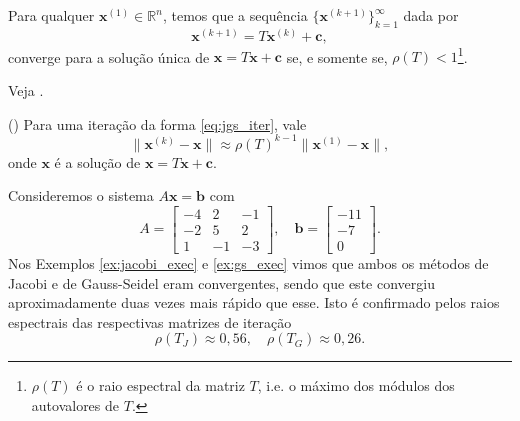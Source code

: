 \begin{teo}
  Para qualquer $\pmb{x}^{(1)}\in\mathbb{R}^n$, temos que a sequência $\{\pmb{x}^{(k+1)}\}_{k=1}^{\infty}$ dada por
  \begin{equation}
    \pmb{x}^{(k+1)} = T\pmb{x}^{(k)} + \pmb{c},
  \end{equation}
  converge para a solução única de $\pmb{x} = T\pmb{x} + \pmb{c}$ se, e somente se, $\rho(T) < 1$\footnote{$\rho(T)$ é o raio espectral da matriz $T$, i.e. o máximo dos módulos dos autovalores de $T$.}.
\end{teo}
\begin{dem}
  Veja \cite[Cap. 7, Sec. 7.3]{Burden2015a}.
\end{dem}

\begin{obs}()
  Para uma iteração da forma \eqref{eq:jgs_iter}, vale
  \begin{equation}
    \|\pmb{x}^{(k)}-\pmb{x}\| \approx \rho(T)^{k-1}\|\pmb{x}^{(1)}-\pmb{x}\|,
  \end{equation}
onde $\pmb{x}$ é a solução de $\pmb{x} = T\pmb{x} + \pmb{c}$.
\end{obs}

\begin{ex}\label{ex:jacobi_exec}
  Consideremos o sistema $A\pmb{x} = \pmb{b}$ com
  \begin{equation}
    A =
    \begin{bmatrix}
      -4 & 2 & -1 \\
      -2 & 5 & 2 \\
       1 & -1 & -3
    \end{bmatrix},\quad
    \pmb{b} =
    \begin{bmatrix}
      -11\\ -7\\ 0
    \end{bmatrix}.
  \end{equation}
  Nos Exemplos \ref{ex:jacobi_exec} e \ref{ex:gs_exec} vimos que ambos os métodos de Jacobi e de Gauss-Seidel eram convergentes, sendo que este convergiu aproximadamente duas vezes mais rápido que esse. Isto é confirmado pelos raios espectrais das respectivas matrizes de iteração
  \begin{equation}
    \rho(T_J) \approx 0,56,\quad\rho(T_G) \approx 0,26.
  \end{equation}

% 
\end{ex}

